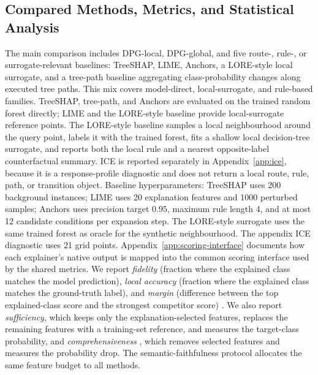 \documentclass[runningheads]{llncs}
\begin{document}
\subsection{Compared Methods, Metrics, and Statistical Analysis}
The main comparison includes DPG-local, DPG-global, and five route-, rule-, or surrogate-relevant baselines: TreeSHAP, LIME, Anchors, a LORE-style local surrogate, and a tree-path baseline aggregating class-probability changes along executed tree paths. This mix covers model-direct, local-surrogate, and rule-based families. TreeSHAP, tree-path, and Anchors are evaluated on the trained random forest directly; LIME and the LORE-style baseline provide local-surrogate reference points. The LORE-style baseline samples a local neighbourhood around the query point, labels it with the trained forest, fits a shallow local decision-tree surrogate, and reports both the local rule and a nearest opposite-label counterfactual summary. ICE is reported separately in Appendix~\ref{app:ice}, because it is a response-profile diagnostic and does not return a local route, rule, path, or transition object.
Baseline hyperparameters: TreeSHAP uses 200 background instances; LIME uses 20 explanation features and 1000 perturbed samples; Anchors uses precision target $0.95$, maximum rule length 4, and at most 12 candidate conditions per expansion step. The LORE-style surrogate uses the same trained forest as oracle for the synthetic neighbourhood. The appendix ICE diagnostic uses 21 grid points.
Appendix~\ref{app:scoring-interface} documents how each explainer's native output is mapped into the common scoring interface used by the shared metrics.
We report \emph{fidelity} (fraction where the explained class matches the model prediction), \emph{local accuracy} (fraction where the explained class matches the ground-truth label), and \emph{margin} (difference between the top explained-class score and the strongest competitor score) \cite{vilone2021notions,nauta2023anecdotal,doshi2017rigorous,miller2019explanation}. We also report \emph{sufficiency}, which keeps only the explanation-selected features, replaces the remaining features with a training-set reference, and measures the target-class probability, and \emph{comprehensiveness} \cite{nauta2023anecdotal}, which removes selected features and measures the probability drop. The semantic-faithfulness protocol allocates the same feature budget to all methods.
\end{document}
